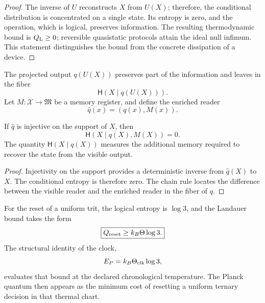 \begin{proof}
The inverse of \(U\) reconstructs \(X\) from \(U(X)\); therefore, the conditional distribution is concentrated on a single state. Its entropy is zero, and the operation, which is logical, preserves information. The resulting thermodynamic bound is \(Q_{\rm L}\geq0\); reversible quasistatic protocols attain the ideal null infimum. This statement distinguishes the bound from the concrete dissipation of a device.
\end{proof}

The projected output \(q(U(X))\) preserves part of the information and
leaves in the fiber
\begin{equation}
 \mathsf H(X\mid q(U(X))).
 \label{eq:rm-obs-reader-forgotten-info}
\end{equation}
Let \(M:\mathcal X\to\mathfrak M\) be a memory register, and define the
enriched reader
\begin{equation}
 \widehat q(x)=(q(x),M(x)).
 \label{eq:rm-obs-enriched-reader}
\end{equation}

\begin{proposition}
\label{prop:rm-obs-recoverability}
If \(\widehat q\) is injective on the support of \(X\), then
\begin{equation}
 \boxed{\mathsf H(X\mid q(X),M(X))=0.}
 \label{eq:rm-obs-recoverability}
\end{equation}
The quantity \(\mathsf H(X\mid q(X))\) measures the additional memory required to
recover the state from the visible output.
\end{proposition}

\begin{proof}
Injectivity on the support provides a deterministic inverse from
\(\widehat q(X)\) to \(X\). The conditional entropy is therefore zero. The
chain rule locates the difference between the visible reader and the
enriched reader in the fiber of \(q\).
\end{proof}

For the reset of a uniform trit, the logical entropy is \(\log3\),
and the Landauer bound takes the form
\begin{equation}
 \boxed{Q_{\rm reset}\geq k_B\Theta\log3.}
 \label{eq:rm-obs-trit-reset}
\end{equation}
The structural identity of the clock,
\begin{equation}
 E_P=k_B\Theta_{\rm clk}\log3,
 \label{eq:rm-obs-planck-trit-landauer}
\end{equation}
evaluates that bound at the declared chronological temperature. The Planck
quantum then appears as the minimum cost of resetting a uniform ternary decision
in that thermal chart.

